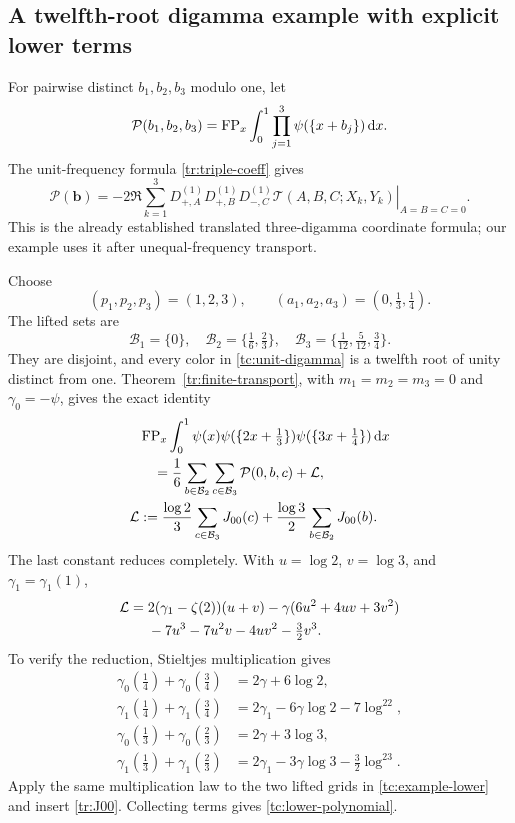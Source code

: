 \subsection{A twelfth-root digamma example with explicit lower terms}
For pairwise distinct $b_1,b_2,b_3$ modulo one, let
\[
 \mathcal P(b_1,b_2,b_3)
  =\operatorname{FP}_x\int_0^1\prod_{j=1}^3\psi(\{x+b_j\})\,\mathrm d x.
\]
The unit-frequency formula \eqref{tr:triple-coeff} gives
\begin{equation}\label{tc:unit-digamma}
 \mathcal P(\boldsymbol b)
  =-2\Re\sum_{k=1}^3
    \left.
      D_{+,A}^{(1)}D_{+,B}^{(1)}D_{-,C}^{(1)}
        \mathcal T(A,B,C;X_k,Y_k)
    \right|_{A=B=C=0}.
\end{equation}
This is the already established translated three-digamma coordinate
formula; our example uses it after unequal-frequency transport.

Choose
\begin{equation}\label{tc:example-data}
 (p_1,p_2,p_3)=(1,2,3),\qquad
 (a_1,a_2,a_3)=(0,\tfrac13,\tfrac14).
\end{equation}
The lifted sets are
\[
 \mathcal B_1=\{0\},\quad
 \mathcal B_2=\{\tfrac16,\tfrac23\},\quad
 \mathcal B_3=\{\tfrac1{12},\tfrac5{12},\tfrac34\}.
\]
They are disjoint, and every color in \eqref{tc:unit-digamma} is a
twelfth root of unity distinct from one. Theorem~\ref{tr:finite-transport},
with $m_1=m_2=m_3=0$ and $\gamma_0=-\psi$, gives the exact identity
\begin{align}
 &\operatorname{FP}_x\int_0^1\psi(x)\psi(\{2x+\tfrac13\})
                              \psi(\{3x+\tfrac14\})\,\mathrm d x\notag\\
 &\quad=\frac16\sum_{b\in\mathcal B_2}\sum_{c\in\mathcal B_3}
                     \mathcal P(0,b,c)+\mathcal L,\label{tc:example}\\
 \mathcal L
 &:=\frac{\log2}{3}\sum_{c\in\mathcal B_3}J_{00}(c)
       +\frac{\log3}{2}\sum_{b\in\mathcal B_2}J_{00}(b).
       \label{tc:example-lower}
\end{align}
The last constant reduces completely. With $u=\log2$, $v=\log3$,
and $\gamma_1=\gamma_1(1)$,
\begin{align}\label{tc:lower-polynomial}
 \mathcal L={}&2(\gamma_1-\zeta(2))(u+v)
   -\gamma(6u^2+4uv+3v^2)\notag\\
 &-7u^3-7u^2v-4uv^2-\tfrac32v^3.
\end{align}
To verify the reduction, Stieltjes multiplication gives
\begin{align*}
 \gamma_0(\tfrac14)+\gamma_0(\tfrac34)&=2\gamma+6\log2,\\
 \gamma_1(\tfrac14)+\gamma_1(\tfrac34)
      &=2\gamma_1-6\gamma\log2-7\log^22,\\
 \gamma_0(\tfrac13)+\gamma_0(\tfrac23)&=2\gamma+3\log3,\\
 \gamma_1(\tfrac13)+\gamma_1(\tfrac23)
      &=2\gamma_1-3\gamma\log3-\tfrac32\log^23.
\end{align*}
Apply the same multiplication law to the two lifted grids in
\eqref{tc:example-lower} and insert \eqref{tr:J00}. Collecting terms
gives \eqref{tc:lower-polynomial}.


